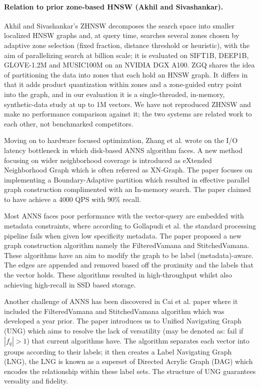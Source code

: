 \documentclass[conference]{IEEEtran}
\begin{document}
\paragraph{Relation to prior zone-based HNSW (Akhil and Sivashankar).}
Akhil and Sivashankar's ZHNSW \cite{akhil2025} decomposes the search space into smaller localized HNSW graphs and, at query time, searches several zones chosen by adaptive zone selection (fixed fraction, distance threshold or heuristic), with the aim of parallelizing search at billion scale; it is evaluated on SIFT1B, DEEP1B, GLOVE-1.2M and MUSIC100M on an NVIDIA DGX A100. ZGQ shares the idea of partitioning the data into zones that each hold an HNSW graph. It differs in that it adds product quantization within zones and a zone-guided entry point into the graph, and in our evaluation it is a single-threaded, in-memory, synthetic-data study at up to 1M vectors. We have not reproduced ZHNSW and make no performance comparison against it; the two systems are related work to each other, not benchmarked competitors.

Moving on to hardware focused optimization, Zhang et al. \cite{zhang2025} wrote on the I/O latency bottleneck in which disk-based ANNS algorithm faces. A new method focusing on wider neighborhood coverage is introduced as eXtended Neighborhood Graph which is often referred as XN-Graph. The paper focuses on implementing a Boundary-Adaptive partition which resulted in effective parallel graph construction complimented with an In-memory search. The paper claimed to have achieve a 4000 QPS with 90\% recall.

Most ANNS faces poor performance with the vector-query are embedded with metadata constraints, where according to Gollapudi et al. \cite{gollapudi2023} the standard processing pipeline fails when given low specificity metadata. The paper proposed a new graph construction algorithm namely the FilteredVamana and StitchedVamana. These algorithms have an aim to modify the graph to be label (metadata)-aware. The edges are appended and removed based off the proximity and the labels that the vector holds. These algorithms resulted in high-throughput whilst also achieving high-recall in SSD based storage.

Another challenge of ANNS has been discovered in Cai et al. \cite{cai2024} paper where it included the FilteredVamana and StitchedVamana algorithm which was developed a year prior. The paper introduces us to Unified Navigating Graph (UNG) which aims to resolve the lack of versatility (may be denoted as: fail if $|f_q| > 1$) that current algorithms have. The algorithm separates each vector into groups according to their labels; it then creates a Label Navigating Graph (LNG), the LNG is known as a superset of Directed Acrylic Graph (DAG) which encodes the relationship within these label sets. The structure of UNG guarantees versality and fidelity.
\end{document}

